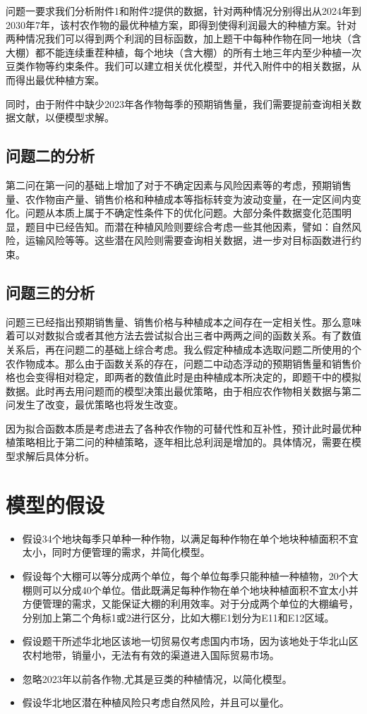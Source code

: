 \documentclass{cumcmthesis}
\begin{document}
问题一要求我们分析附件1和附件2提供的数据，针对两种情况分别得出从2024年到2030年7年，该村农作物的最优种植方案，即得到使得利润最大的种植方案。针对两种情况我们可以得到两个利润的目标函数，加上题干中每种作物在同一地块（含大棚）都不能连续重茬种植，每个地块（含大棚）的所有土地三年内至少种植一次豆类作物等约束条件。我们可以建立相关优化模型，并代入附件中的相关数据，从而得出最优种植方案。

同时，由于附件中缺少2023年各作物每季的预期销售量，我们需要提前查询相关数据文献，以便模型求解。

\subsection{问题二的分析}

第二问在第一问的基础上增加了对于不确定因素与风险因素等的考虑，预期销售量、农作物亩产量、销售价格和种植成本等指标转变为波动变量，在一定区间内变化。问题从本质上属于不确定性条件下的优化问题。大部分条件数据变化范围明显，题目中已经告知。而潜在种植风险则要综合考虑一些其他因素，譬如：自然风险，运输风险等等。这些潜在风险则需要查询相关数据，进一步对目标函数进行约束。

\subsection{问题三的分析}

问题三已经指出预期销售量、销售价格与种植成本之间存在一定相关性。那么意味着可以对数拟合或者其他方法去尝试拟合出三者中两两之间的函数关系。有了数值关系后，再在问题二的基础上综合考虑。我么假定种植成本选取问题二所使用的个农作物成本。那么由于函数关系的存在，问题二中动态浮动的预期销售量和销售价格也会变得相对稳定，即两者的数值此时是由种植成本所决定的，即题干中的模拟数据。此时再去用问题而的模型决策出最优策略，由于相应农作物相关数据与第二问发生了改变，最优策略也将发生改变。

因为拟合函数本质是考虑进去了各种农作物的可替代性和互补性，预计此时最优种植策略相比于第二问的种植策略，逐年相比总利润是增加的。具体情况，需要在模型求解后具体分析。


\section{模型的假设}

\begin{itemize}
\item 	假设34个地块每季只单种一种作物，以满足每种作物在单个地块种植面积不宜太小，同时方便管理的需求，并简化模型。
\item 	假设每个大棚可以等分成两个单位，每个单位每季只能种植一种植物，20个大棚则可以分成40个单位。借此既满足每种作物在单个地块种植面积不宜太小并方便管理的需求，又能保证大棚的利用效率。对于分成两个单位的大棚编号，分别加上第二个角标1或2进行区分，比如大棚E1划分为E11和E12区域。
\item  假设题干所述华北地区该地一切贸易仅考虑国内市场，因为该地处于华北山区农村地带，销量小，无法有有效的渠道进入国际贸易市场。
\item 	忽略2023年以前各作物,尤其是豆类的种植情况，以简化模型。
\item   假设华北地区潜在种植风险只考虑自然风险，并且可以量化。
\end{itemize}
\end{document}

